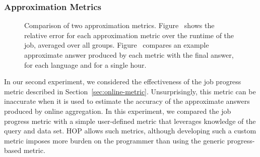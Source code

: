 \subsubsection{Approximation Metrics}

\begin{figure}[ht]
  \centering
  \hspace{4pt}
  \caption{Comparison of two approximation metrics. 
    Figure~ shows the relative error for
    each approximation metric over the runtime of the job, averaged over all
    groups. Figure~ compares an example approximate
    answer produced by each metric with the final answer, for each language and
    for a single hour.}
\label{fig:approx}
\end{figure}

In our second experiment, we considered the effectiveness of the job progress
metric described in Section~\ref{sec:online-metric}. Unsurprisingly, this metric
can be inaccurate when it is used to estimate the accuracy of the approximate
answers produced by online aggregation. In this experiment, we compared the job
progress metric with a simple user-defined metric that leverages knowledge of
the query and data set. HOP allows such metrics, although developing such a
custom metric imposes more burden on the programmer than using the generic
progress-based metric.

